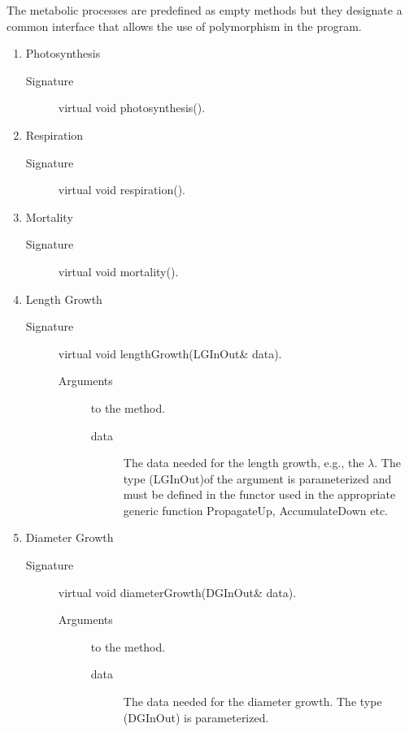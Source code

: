 The metabolic processes are predefined as empty methods but they designate a common
interface that allows the use of polymorphism in the program.
\begin{enumerate}
\item Photosynthesis
  \begin{description}
     \item [Signature] virtual void photosynthesis().
  \end{description}
\item Respiration
  \begin{description}
     \item [Signature] virtual void respiration().
  \end{description}
\item Mortality
   \begin{description}
     \item [Signature] virtual void mortality().
   \end{description}
\item Length Growth
   \begin{description}
       \item [Signature] virtual void lengthGrowth(LGInOut\& data).
       \begin{description}
           \item [Arguments] to the method.
           \begin{description} 
                \item [data] The data needed for the length growth,
     e.g., the $\lambda$. The type (LGInOut)of the argument is parameterized 
     and must be defined in the functor used in the appropriate generic function
     PropagateUp, AccumulateDown etc.
            \end{description}
       \end{description}
   \end{description}
\item Diameter Growth  
 \begin{description} 
     \item [Signature]  virtual void diameterGrowth(DGInOut\& data).
     \begin{description}
         \item [Arguments] to the method.
            \begin{description} 
                \item [data]  The data needed for the diameter
     growth. The type (DGInOut) is parameterized.
             \end{description}

\end{description}
\end{description}
\end{enumerate}
